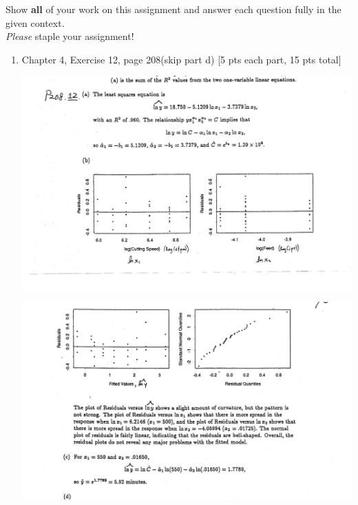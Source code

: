 \documentclass[11pt]{article}\usepackage[]{graphicx}\usepackage[]{color}
\begin{document}

\pagestyle{fancy} 

Show \textbf{all} of your work on this assignment and answer each question fully in the given context. \\


\emph{Please} staple your assignment!

\begin{enumerate}

	\item Chapter 4, Exercise 12, page 208(skip part d)   [5 pts each part, 15 pts total]
    	\begin{center}
    	\begin{minipage}{\linewidth}
    		\centering
    		\includegraphics[width=\textwidth]{hw5-1-1.JPG}
    	\end{minipage}
    \end{center}
    	\begin{center}
    	\begin{minipage}{\linewidth}
    		\centering
    		\includegraphics[width=\textwidth]{hw5-1-2.JPG}
    	\end{minipage}
    	\end{center}
\pagebreak


\end{enumerate}
\end{document}
